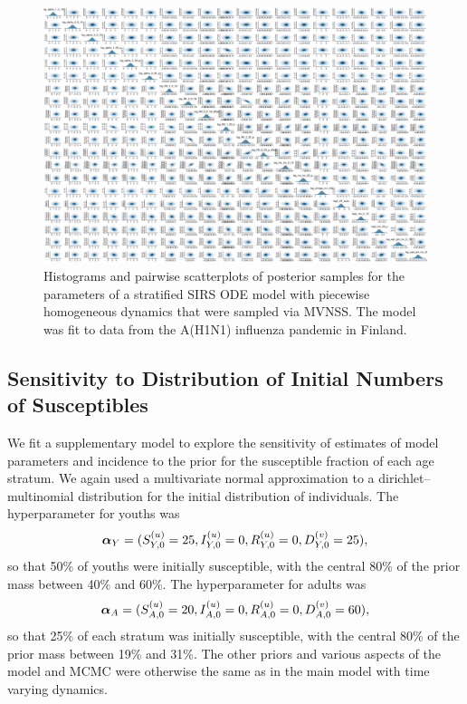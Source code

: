 \begin{figure}
	\centering
	\includegraphics[width=\linewidth]{figures/flu_const_pairs}
	\caption[Histograms and pairwise scatterplots of posterior samples of the parameters from a stratified SIRS ODE model with piecewise homogeneous dynamics fit to data from the A(H1N1) influenza pandemic in Finland.]{Histograms and pairwise scatterplots of posterior samples for the parameters of a stratified SIRS ODE model with piecewise homogeneous dynamics that were sampled via MVNSS. The model was fit to data from the A(H1N1) influenza pandemic in Finland.}
	\label{fig:fluconstpairs}
\end{figure}

\newpage
\subsection{Sensitivity to Distribution of Initial Numbers of Susceptibles}
\label{subsec:flu_highsusc_sensitivity}

We fit a supplementary model to explore the sensitivity of estimates of model parameters and incidence to the prior for the susceptible fraction of each age stratum. We again used a multivariate normal approximation to a dirichlet--multinomial distribution for the initial distribution of individuals. The hyperparameter for youths was $$ \boldsymbol{\alpha}_Y = ({S_{Y,0}^{(u)}} = 25, {I_{Y,0}^{(u)}}=0,{R_{Y,0}^{(u)}}=0,D_{Y,0}^{(v)} = 25), $$ so that 50\% of youths were initially susceptible, with the central 80\% of the prior mass between 40\% and 60\%. The hyperparameter for adults was $$ \boldsymbol{\alpha}_A = ({S_{A,0}^{(u)}} = 20, {I_{A,0}^{(u)}}=0,{R_{A,0}^{(u)}}=0,D_{A,0}^{(v)} = 60), $$ so that 25\% of each stratum was initially susceptible, with the central 80\% of the prior mass between 19\% and 31\%. The other priors and various aspects of the model and MCMC were otherwise the same as in the main model with time varying dynamics.

